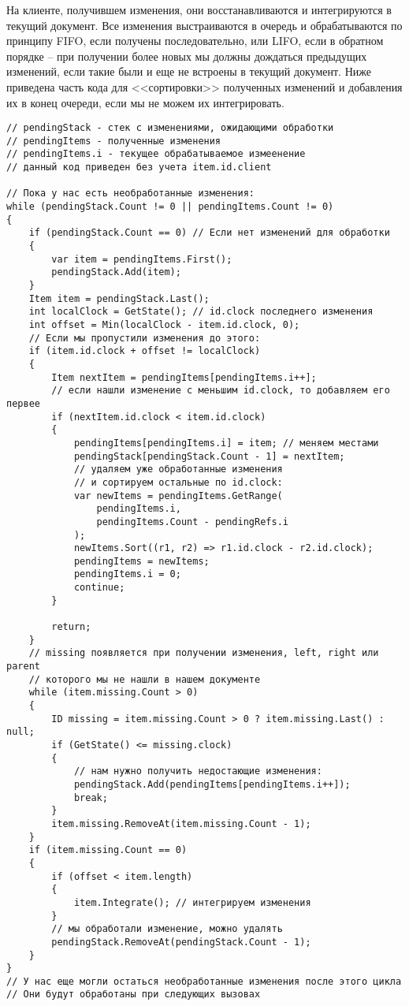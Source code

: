 \documentclass[a4paper,12pt]{article}
\begin{document}
    На клиенте, получившем изменения, они восстанавливаются и интегрируются в текущий документ. Все изменения выстраиваются в очередь и обрабатываются по принципу FIFO, если получены последовательно, или LIFO, если в обратном порядке -- при получении более новых мы должны дождаться предыдущих изменений, если такие были и еще не встроены в текущий документ. Ниже приведена часть кода для <<сортировки>> полученных изменений и добавления их в конец очереди, если мы не можем их интегрировать.
    \begin{verbatim}
// pendingStack - стек с изменениями, ожидающими обработки
// pendingItems - полученные изменения
// pendingItems.i - текущее обрабатываемое измеенение
// данный код приведен без учета item.id.client

// Пока у нас есть необработанные изменения:
while (pendingStack.Count != 0 || pendingItems.Count != 0)
{
    if (pendingStack.Count == 0) // Если нет изменений для обработки
    {
        var item = pendingItems.First();
        pendingStack.Add(item);
    }
    Item item = pendingStack.Last();
    int localClock = GetState(); // id.clock последнего изменения
    int offset = Min(localClock - item.id.clock, 0);
    // Если мы пропустили изменения до этого:
    if (item.id.clock + offset != localClock)
    {
        Item nextItem = pendingItems[pendingItems.i++];
        // если нашли изменение с меньшим id.clock, то добавляем его первее
        if (nextItem.id.clock < item.id.clock)
        {
            pendingItems[pendingItems.i] = item; // меняем местами
            pendingStack[pendingStack.Count - 1] = nextItem;
            // удаляем уже обработанные изменения
            // и сортируем остальные по id.clock:
            var newItems = pendingItems.GetRange(
                pendingItems.i,
                pendingItems.Count - pendingRefs.i
            );
            newItems.Sort((r1, r2) => r1.id.clock - r2.id.clock);
            pendingItems = newItems;
            pendingItems.i = 0;
            continue;
        }

        return;
    }
    // missing появляется при получении изменения, left, right или parent
    // которого мы не нашли в нашем документе
    while (item.missing.Count > 0)
    {
        ID missing = item.missing.Count > 0 ? item.missing.Last() : null;
        if (GetState() <= missing.clock)
        {
            // нам нужно получить недостающие изменения:
            pendingStack.Add(pendingItems[pendingItems.i++]);
            break;
        }
        item.missing.RemoveAt(item.missing.Count - 1);
    }
    if (item.missing.Count == 0)
    {
        if (offset < item.length)
        {
            item.Integrate(); // интегрируем изменения
        }
        // мы обработали изменение, можно удалять
        pendingStack.RemoveAt(pendingStack.Count - 1);
    }
}
// У нас еще могли остаться необработанные изменения после этого цикла
// Они будут обработаны при следующих вызовах
    \end{verbatim}
\end{document}
